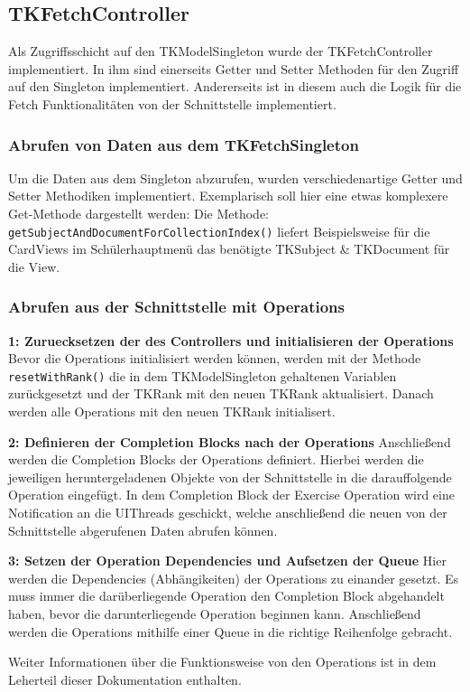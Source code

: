 \subsection{TKFetchController}
Als Zugriffsschicht auf den TKModelSingleton wurde der TKFetchController implementiert. In ihm sind einerseits Getter und Setter Methoden für den Zugriff auf den Singleton implementiert. Andererseits ist in diesem auch die Logik für die Fetch Funktionalitäten von der Schnittstelle implementiert.

\subsubsection{Abrufen von Daten aus dem TKFetchSingleton}

Um die Daten aus dem Singleton abzurufen, wurden verschiedenartige Getter und Setter Methodiken implementiert. Exemplarisch soll hier eine etwas komplexere Get-Methode dargestellt werden:
Die Methode: \texttt{getSubjectAndDocumentForCollectionIndex()} liefert Beispielsweise für die CardViews im Schülerhauptmenü das benötigte TKSubject \& TKDocument für die View.

\subsubsection{Abrufen aus der Schnittstelle mit Operations}


\textbf{1: Zuruecksetzen der des Controllers und initialisieren der Operations}
Bevor die Operations initialisiert werden können, werden mit der Methode \texttt{resetWithRank()} die in dem TKModelSingleton gehaltenen Variablen zurückgesetzt und der TKRank mit den neuen TKRank aktualisiert. Danach werden alle Operations mit den neuen TKRank initialisert.

\textbf{2: Definieren der Completion Blocks nach der Operations}
Anschließend werden die Completion Blocks der Operations definiert. Hierbei werden die jeweiligen heruntergeladenen Objekte von der Schnittstelle in die darauffolgende Operation eingefügt. In dem Completion Block der Exercise Operation wird eine Notification an die UIThreads geschickt, welche anschließend die neuen von der Schnittstelle abgerufenen Daten abrufen können.

\textbf{3: Setzen der Operation Dependencies und Aufsetzen der Queue}
Hier werden die Dependencies (Abhängikeiten) der Operations zu einander gesetzt. Es muss immer die darüberliegende Operation den Completion Block abgehandelt haben, bevor die darunterliegende Operation beginnen kann. Anschließend werden die Operations mithilfe einer Queue in die richtige Reihenfolge gebracht.

Weiter Informationen über die Funktionsweise von den Operations ist in dem Leherteil dieser Dokumentation enthalten.